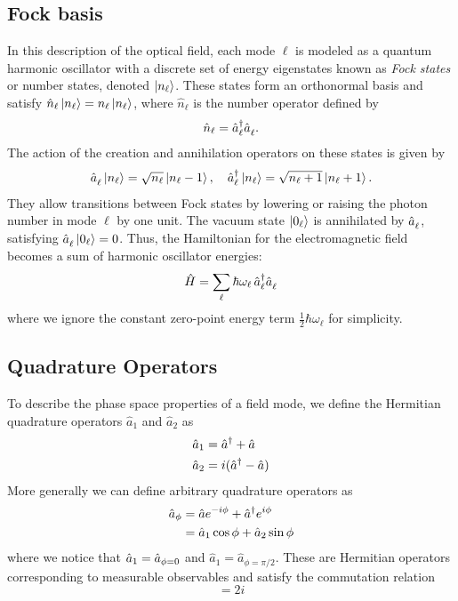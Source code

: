 \subsection*{Fock basis}
In this description of the optical field, each mode $\ell$ is modeled as a quantum harmonic oscillator with a discrete set of energy eigenstates known as \textit{Fock states} or number states, denoted $\ket{n_\ell}$. These states form an orthonormal basis and satisfy $\hat{n}_{\ell} \ket{n_\ell} = n_\ell \ket{n_\ell}$, where $\hat{n}_{\ell}$ is the number operator defined by
\[
\hat{n}_{\ell} = \hat{a}_{\ell}^\dagger \hat{a}^{\vphantom{\dagger}}_{\ell}.
\]
The action of the creation and annihilation operators on these states is given by
\[
\hat{a}^{\vphantom{\dagger}}_{\ell} \ket{n_\ell} = \sqrt{n_\ell} \ket{n_\ell - 1}, \quad
\hat{a}_{\ell}^\dagger \ket{n_\ell} = \sqrt{n_\ell + 1} \ket{n_\ell + 1}.
\]
They allow transitions between Fock states by lowering or raising the photon number in mode $\ell$ by one unit. The vacuum state $\ket{0_\ell}$ is annihilated by $\hat{a}^{\vphantom{\dagger}}_{\ell}$, satisfying $\hat{a}^{\vphantom{\dagger}}_{\ell} \ket{0_\ell} = 0$. Thus, the Hamiltonian for the electromagnetic field becomes a sum of harmonic oscillator energies:
\begin{equation}
\hat{H} = \sum_\ell \hbar \omega_{\ell} \, \hat{a}_{\ell}^\dagger \hat{a}^{\vphantom{\dagger}}_{\ell} 
\end{equation}
where we ignore the constant zero-point energy term $\frac{1}{2} \hbar \omega_{\ell}$ for simplicity.

\subsection*{Quadrature Operators}

To describe the phase space properties of a field mode, we define the Hermitian quadrature operators $\hat{a}_{1}$ and $\hat{a}_{2}$ as
\begin{equation}
  \begin{split}
    \hat{a}_{1} &= \hat{a}^\dagger + \hat{a}^{\vphantom{\dagger}}   \\
    \hat{a}_{2} &= i(\hat{a}^{\dagger} - \hat{a})
  \end{split}
\end{equation}
More generally we can define arbitrary quadrature operators as 
\begin{align}
  \hat{a}_{\phi} &=\hat{a}  e^{-i\phi}+ \hat{a}^{\dagger} e^{i\phi} \notag \\ 
  & =  \hat{a}_{1} \cos \phi + \hat{a}_{2} \sin \phi 
\end{align}
where we notice that $\hat{a}_{1} = \hat{a}_{\phi=0\vphantom{\pi/2}}$ and $\hat{a}_{1} = \hat{a}_{\phi=\pi/2}$. These are Hermitian operators corresponding to measurable observables and satisfy the commutation relation
\begin{equation}
[\hat{a}_{\phi \vphantom{\pi/2}}, \hat{a}_{\phi+\pi/2}] = 2i
\end{equation}

